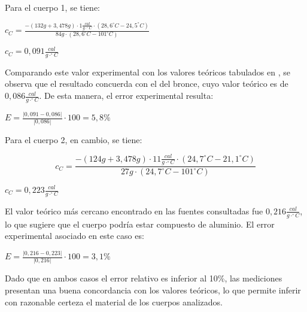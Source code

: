 \documentclass[12pt, a4paper]{article}
\begin{document}
Para el cuerpo 1, se tiene:

\begin{center}
    $ c_C = \frac{ - (132g + 3,478g) \cdot 1 \frac{cal}{g \cdot ^\circ C} \cdot (28,6^\circ C - 24,5^\circ C) }{ 84g \cdot (28,6^\circ C - 101^\circ C) } $
\end{center}
\begin{center}
    $ c_C = 0,091 \frac{cal}{g \cdot ^\circ C} $
\end{center}

Comparando este valor experimental con los valores teóricos tabulados en \cite{educamix_capacidad, fisicanet_calor}, se observa que el resultado concuerda con el del bronce, cuyo valor teórico es de $ 0,086 \frac{cal}{g \cdot ^\circ C} $. De esta manera, el error experimental resulta:

\begin{center}
    $ E =  \frac{|0,091-0,086|}{|0,086|}\cdot 100 = 5,8 \% $
\end{center}

Para el cuerpo 2, en cambio, se tiene:

\begin{equation}
    c_C = \frac{ - (124g + 3,478g) \cdot 11 \frac{cal}{g \cdot ^\circ C} \cdot (24,7^\circ C - 21,1^\circ C) }{ 27g \cdot (24,7^\circ C - 101^\circ C) }
\end{equation}
\begin{center}
    $ c_C = 0,223 \frac{cal}{g \cdot ^\circ C} $
\end{center}

El valor teórico más cercano encontrado en las fuentes consultadas \cite{educamix_capacidad,fisicanet_calor} fue $ 0,216 \frac{cal}{g \cdot ^\circ C} $, lo que sugiere que el cuerpo podría estar compuesto de aluminio. El error experimental asociado en este caso es:
\begin{center}
    $ E =  \frac{|0,216-0,223|}{|0,216|}\cdot 100 = 3,1 \% $
\end{center}

Dado que en ambos casos el error relativo es inferior al 10\%, las mediciones presentan una buena concordancia con los valores teóricos, lo que permite inferir con razonable certeza el material de los cuerpos analizados.


\newpage
 
\end{document}
